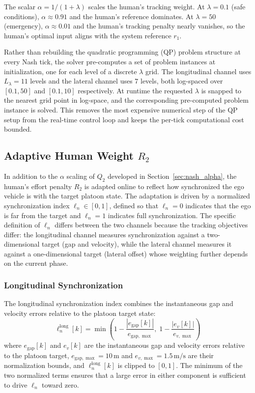 \documentclass[12pt,a4paper,oneside]{report}
\begin{document}
The scalar $\alpha = 1/(1+\lambda)$ scales the human's tracking weight. At $\lambda = 0.1$ (safe conditions), $\alpha \approx 0.91$ and the human's reference dominates. At $\lambda = 50$ (emergency), $\alpha \approx 0.01$ and the human's tracking penalty nearly vanishes, so the human's optimal input aligns with the system reference $r_1$.

Rather than rebuilding the quadratic programming (QP) problem structure at every Nash tick, the solver pre-computes a set of problem instances at initialization, one for each level of a discrete $\lambda$ grid. The longitudinal channel uses $L_\lambda = 11$ levels and the lateral channel uses $7$ levels, both log-spaced over $[0.1, 50]$ and $[0.1, 10]$ respectively. At runtime the requested $\lambda$ is snapped to the nearest grid point in log-space, and the corresponding pre-computed problem instance is solved. This removes the most expensive numerical step of the QP setup from the real-time control loop and keeps the per-tick computational cost bounded.

\subsection{Adaptive Human Weight $R_2$}
\label{sec:nash_r2}

In addition to the $\alpha$ scaling of $Q_2$ developed in Section~\ref{sec:nash_alpha}, the human's effort penalty $R_2$ is adapted online to reflect how synchronized the ego vehicle is with the target platoon state. The adaptation is driven by a normalized synchronization index $\ell_n \in [0, 1]$, defined so that $\ell_n = 0$ indicates that the ego is far from the target and $\ell_n = 1$ indicates full synchronization. The specific definition of $\ell_n$ differs between the two channels because the tracking objectives differ: the longitudinal channel measures synchronization against a two-dimensional target (gap and velocity), while the lateral channel measures it against a one-dimensional target (lateral offset) whose weighting further depends on the current phase.

\subsubsection{Longitudinal Synchronization}

The longitudinal synchronization index combines the instantaneous gap and velocity errors relative to the platoon target state:
\begin{equation}
\ell_n^{\text{long}}[k] = \min\!\left( 1 - \frac{|e_{\text{gap}}[k]|}{e_{\text{gap},\max}}, \; 1 - \frac{|e_v[k]|}{e_{v,\max}} \right)
\label{eq:ln_long_sync}
\end{equation}
where $e_{\text{gap}}[k]$ and $e_v[k]$ are the instantaneous gap and velocity errors relative to the platoon target, $e_{\text{gap},\max} = 10\,\mathrm{m}$ and $e_{v,\max} = 1.5\,\mathrm{m/s}$ are their normalization bounds, and $\ell_n^{\text{long}}[k]$ is clipped to $[0, 1]$. The minimum of the two normalized terms ensures that a large error in either component is sufficient to drive $\ell_n$ toward zero.
\end{document}

